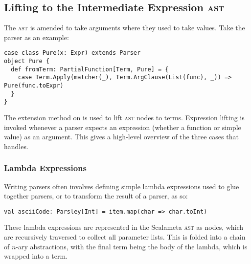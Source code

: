 \documentclass[../../../main.tex]{subfiles}
\begin{document}
\subsection{Lifting to the Intermediate Expression \textsc{ast}}\label{sec:lifting-expr}
The  \textsc{ast} is amended to take  arguments where they used to take  values.
Take the  parser as an example:
\begin{verbatim}
case class Pure(x: Expr) extends Parser
object Pure {
  def fromTerm: PartialFunction[Term, Pure] = {
    case Term.Apply(matcher(_), Term.ArgClause(List(func), _)) => Pure(func.toExpr)
  }
}
\end{verbatim}
%
The  extension method on  is used to lift  \textsc{ast} nodes to  terms.
Expression lifting is invoked whenever a parser expects an expression (whether a function or simple value) as an argument.
This  gives a high-level overview of the three cases that  handles.

\subsubsection{Lambda Expressions}
Writing parsers often involves defining simple lambda expressions used to glue together parsers, or to transform the result of a parser, as so:
\begin{verbatim}
val asciiCode: Parsley[Int] = item.map(char => char.toInt)
\end{verbatim}
%
These lambda expressions are represented in the Scalameta \textsc{ast} as  nodes, which are recursively traversed to collect all parameter lists.
This is folded into a chain of $n$-ary abstractions, with the final term being the body of the lambda, which is wrapped into a  term.
\end{document}
